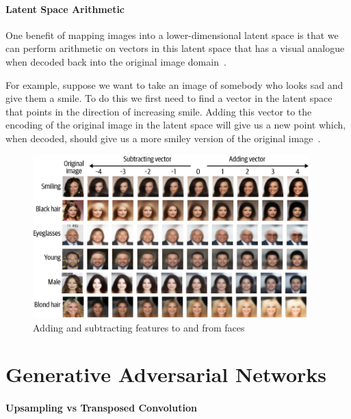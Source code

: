 \paragraph{Latent Space Arithmetic}

One benefit of mapping images into a lower-dimensional latent space is that we can perform arithmetic on vectors in this latent space that has a visual analogue when decoded back into the original image domain~.

For example, suppose we want to take an image of somebody who looks sad and give them a smile.
To do this we first need to find a vector in the latent space that points in the direction of increasing smile.
Adding this vector to the encoding of the original image in the latent space will give us a new point which, when decoded, should give us a more smiley version of the original image~\cite{foster2022generative}.

\begin{figure}
	\begin{center}
		\includegraphics[width=0.95\textwidth]{figures/vae_latent_space_arithmetic}
	\end{center}
	\caption{Adding and subtracting features to and from faces}\label{fig:vae_latent_space_arithmetic}
\end{figure}

\section{Generative Adversarial Networks}

\paragraph{Upsampling vs Transposed Convolution}

